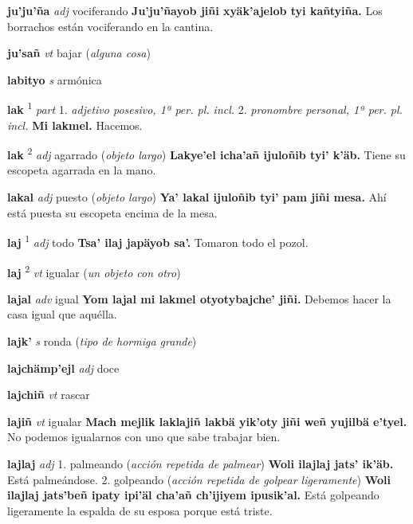 \documentclass[10pt]{scrbook}
\newcommand{\entry}[1]{\textbf{#1}}
\newcommand{\alphaletter}[1]{\end{multicols}\addsec{#1}\begin{multicols}{2}}
\newcommand{\onedefinition}[1]{#1.}
\newcommand{\defsuperscript}[1]{\textsuperscript{#1}}
\newcommand{\nontranslationdef}[1]{\textit{#1}}
\newcommand{\partofspeech}[1]{\textit{#1}}
\newcommand{\spanishtranslation}[1]{#1}
\newcommand{\clarification}[1]{(\textit{#1})}
\newcommand{\cholexample}[1]{\textbf{#1}}
\newcommand{\exampletranslation}[1]{#1}
\begin{document}
\begin{multicols}{2}
\entry{ju'ju'ña}
\partofspeech{adj}
\spanishtranslation{vociferando}
\cholexample{Ju'ju'ñayob jiñi xyäk'ajelob tyi kañtyiña.}
\exampletranslation{Los borrachos están vociferando en la cantina.}

\entry{ju'sañ}
\partofspeech{vt}
\spanishtranslation{bajar}
\clarification{alguna cosa}

\alphaletter{L}

\entry{labityo}
\partofspeech{s}
\spanishtranslation{armónica}

\entry{lak}
\defsuperscript{1}
\partofspeech{part}
\onedefinition{1}
\nontranslationdef{adjetivo posesivo, 1ª per. pl. incl.}
\onedefinition{2}
\nontranslationdef{pronombre personal, 1ª per. pl. incl.}
\cholexample{Mi lakmel.}
\exampletranslation{Hacemos.}

\entry{lak}
\defsuperscript{2}
\partofspeech{adj}
\spanishtranslation{agarrado}
\clarification{objeto largo}
\cholexample{Lakye'el icha'añ ijuloñib tyi' k'äb.}
\exampletranslation{Tiene su escopeta agarrada en la mano.}

\entry{lakal}
\partofspeech{adj}
\spanishtranslation{puesto}
\clarification{objeto largo}
\cholexample{Ya' lakal ijuloñib tyi' pam jiñi mesa.}
\exampletranslation{Ahí está puesta su escopeta encima de la mesa.}

\entry{laj}
\defsuperscript{1}
\partofspeech{adj}
\spanishtranslation{todo}
\cholexample{Tsa' ilaj japäyob sa'.}
\exampletranslation{Tomaron todo el pozol.}

\entry{laj}
\defsuperscript{2}
\partofspeech{vt}
\spanishtranslation{igualar}
\clarification{un objeto con otro}

\entry{lajal}
\partofspeech{adv}
\spanishtranslation{igual}
\cholexample{Yom lajal mi lakmel otyotybajche' jiñi.}
\exampletranslation{Debemos hacer la casa igual que aquélla.}

\entry{lajk'}
\partofspeech{s}
\spanishtranslation{ronda}
\clarification{tipo de hormiga grande}

\entry{lajchämp'ejl}
\partofspeech{adj}
\spanishtranslation{doce}

\entry{lajchiñ}
\partofspeech{vt}
\spanishtranslation{rascar}

\entry{lajiñ}
\partofspeech{vt}
\spanishtranslation{igualar}
\cholexample{Mach mejlik laklajiñ lakbä yik'oty jiñi weñ yujilbä e'tyel.}
\exampletranslation{No podemos igualarnos con uno que sabe trabajar bien.}

\entry{lajlaj}
\partofspeech{adj}
\onedefinition{1}
\spanishtranslation{palmeando}
\clarification{acción repetida de palmear}
\cholexample{Woli ilajlaj jats' ik'äb.}
\exampletranslation{Está palmeándose.}
\onedefinition{2}
\spanishtranslation{golpeando}
\clarification{acción repetida de golpear ligeramente}
\cholexample{Woli ilajlaj jats'beñ ipaty ipi'äl cha'añ ch'ijiyem ipusik'al.}
\exampletranslation{Está golpeando ligeramente la espalda de su esposa porque está triste.}


\end{multicols}
\end{document}
